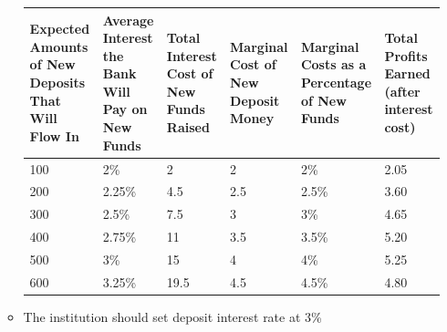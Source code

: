 \begin{itemize}
\begin{itemize}
    \begin{tabular}{|p{2.5cm}|p{2.5cm}|p{2.5cm}|p{2.5cm}|p{2.5cm}|p{2.5cm}|}
        \hline
        Expected Amounts of New Deposits That Will Flow In & Average Interest the Bank Will Pay on New Funds & Total Interest Cost of New Funds Raised & Marginal Cost of New Deposit Money & Marginal Costs as a Percentage of New Funds & Total Profits Earned (after interest cost) \\ \hline
        100 & 2\% & 2 & 2 & 2\% & 2.05 \\ \hline
        200 & 2.25\% & 4.5 & 2.5 & 2.5\% & 3.60 \\ \hline
        300 & 2.5\% & 7.5 & 3 & 3\% & 4.65 \\ \hline
        400 & 2.75\% & 11 & 3.5 & 3.5\% & 5.20 \\ \hline
        \color{blue}500 & \color{blue}3\% & \color{blue}15 & \color{blue}4 & \color{blue}4\% & \color{blue}5.25 \\ \hline
        600 & 3.25\% & 19.5 & 4.5 & 4.5\% & 4.80 \\ \hline
\end{tabular}


    \item The institution should set deposit interest rate at 3\%
    \end{itemize}
\end{itemize}



